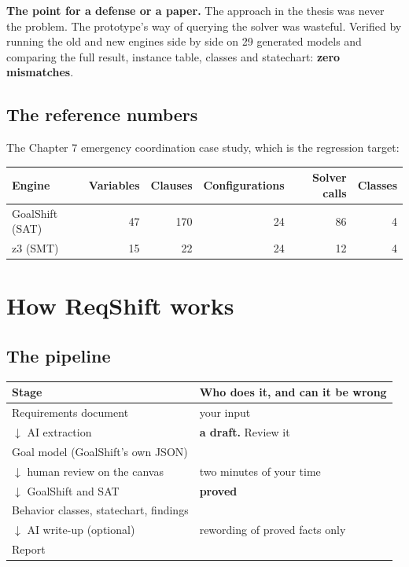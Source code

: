 \documentclass[11pt,a4paper]{article}
\begin{document}
\begin{keybox}
\textbf{The point for a defense or a paper.} The approach in the thesis was never the
problem. The prototype's way of querying the solver was wasteful. Verified by running
the old and new engines side by side on 29 generated models and comparing the full
result, instance table, classes and statechart: \textbf{zero mismatches}.
\end{keybox}

\subsection{The reference numbers}

The Chapter 7 emergency coordination case study, which is the regression target:

\begin{center}
\begin{tabular}{@{}lrrrrr@{}}
\toprule
\textbf{Engine} & \textbf{Variables} & \textbf{Clauses} & \textbf{Configurations}
  & \textbf{Solver calls} & \textbf{Classes} \\
\midrule
GoalShift (SAT) & 47 & 170 & 24 & 86 & 4 \\
z3 (SMT) & 15 & 22 & 24 & 12 & 4 \\
\bottomrule
\end{tabular}
\end{center}

\section{How ReqShift works}

\subsection{The pipeline}

\begin{center}
\begin{tabular}{@{}ll@{}}
\toprule
\textbf{Stage} & \textbf{Who does it, and can it be wrong} \\
\midrule
Requirements document & your input \\
$\downarrow$ AI extraction & \textbf{a draft.} Review it \\
Goal model (GoalShift's own JSON) & \\
$\downarrow$ human review on the canvas & two minutes of your time \\
$\downarrow$ GoalShift and SAT & \textbf{proved} \\
Behavior classes, statechart, findings & \\
$\downarrow$ AI write-up (optional) & rewording of proved facts only \\
Report & \\
\bottomrule
\end{tabular}
\end{center}
\end{document}

